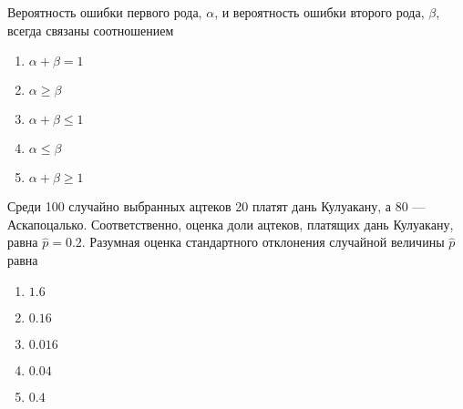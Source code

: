 \documentclass[t]{beamer}
\begin{document}
 \begin{frame} \label{27} 
\begin{block}{27} 

Вероятность ошибки первого рода, $\alpha$, и вероятность ошибки второго рода, $\beta$, всегда связаны соотношением
 


 \end{block} 
\begin{enumerate} 
\item[] \hyperlink{27-No}{\beamergotobutton{} $\alpha+\beta=1$}
\item[] \hyperlink{27-No}{\beamergotobutton{} $\alpha\geq \beta $}
\item[] \hyperlink{27-No}{\beamergotobutton{} $\alpha+\beta \leq 1$}
\item[] \hyperlink{27-No}{\beamergotobutton{} $\alpha\leq \beta $}
\item[] \hyperlink{27-No}{\beamergotobutton{} $\alpha+\beta \geq 1$}
\end{enumerate} 
\end{frame} 


 \begin{frame} \label{28} 
\begin{block}{28} 

Среди 100 случайно выбранных ацтеков 20 платят дань Кулуакану, а 80 — Аскапоцалько. Соответственно, оценка доли ацтеков, платящих дань Кулуакану, равна $\hat{p}=0.2$. Разумная оценка стандартного отклонения случайной величины $\hat{p}$ равна
 


 \end{block} 
\begin{enumerate} 
\item[] \hyperlink{28-No}{\beamergotobutton{} $1.6$}
\item[] \hyperlink{28-No}{\beamergotobutton{} $0.16$}
\item[] \hyperlink{28-No}{\beamergotobutton{} $0.016$}
\item[] \hyperlink{28-Yes}{\beamergotobutton{} $0.04$}
\item[] \hyperlink{28-No}{\beamergotobutton{} $0.4$}
\end{enumerate} 
\end{frame} 
\end{document}
